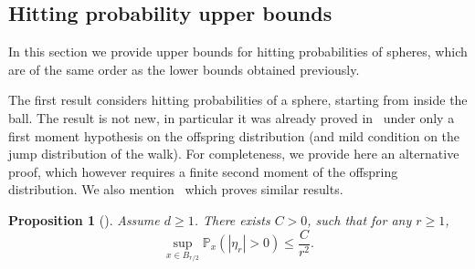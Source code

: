 \documentclass[11pt]{article}
\numberwithin{equation}{section}
\theoremstyle{plain}
\newtheorem{proposition}[theorem]{Proposition}
\theoremstyle{definition}
\newcommand{\1}{{\text{\Large $\mathfrak 1$}}}
\begin{document}
\subsection{Hitting probability upper bounds}
In this section we provide upper bounds for hitting probabilities of spheres, which are of the same order as the lower bounds obtained previously.

The first result considers hitting probabilities of a sphere, starting from inside the ball.
The result is not new, in particular it was already proved in~\cite[Prop.\,10.3]{Zhu1} under only a first moment hypothesis on the offspring distribution (and mild condition on the jump distribution of the walk). For completeness, we provide here an alternative proof, which however requires a finite second moment of the offspring distribution. We also mention~\cite{Kes} which proves similar results.
\begin{proposition}[\cite{Zhu1}]\label{prop.hit.inside}
Assume $d\ge 1$. There exists $C>0$, such that for any $r\ge 1$,
\begin{equation*}
\sup_{x\in B_{r/2}} \mathbb P_x(|\eta_r|>0) \le \frac{C}{r^2}.
\end{equation*}
\end{proposition}
\end{document}
